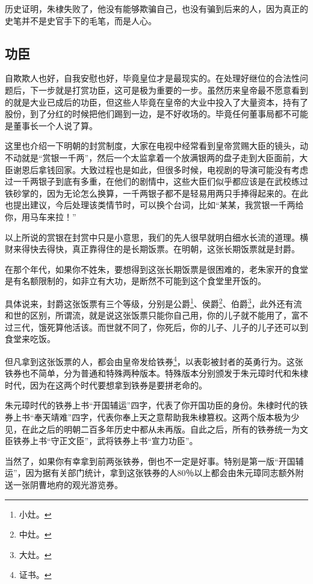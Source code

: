 \begin{multicols}{\theparacolNo}
历史证明，朱棣失败了，他没有能够欺骗自己，也没有骗到后来的人，因为真正的史笔并不是史官手下的毛笔，而是人心。

\subsection{功臣}
自欺欺人也好，自我安慰也好，毕竟皇位才是最现实的。在处理好继位的合法性问题后，下一步就是打赏功臣，这可是极为重要的一步。虽然历来皇帝最不愿意看到的就是大业已成后的功臣，但这些人毕竟在皇帝的大业中投入了大量资本，持有了股份，到了分红的时候把他们踢到一边，是不好收场的。毕竟任何董事局都不可能是董事长一个人说了算。

这里也介绍一下明朝的封赏制度，大家在电视中经常看到皇帝赏赐大臣的镜头，动不动就是“赏银一千两”，然后一个太监拿着一个放满银两的盘子走到大臣面前，大臣谢恩后拿钱回家。大致过程也是如此，但很多时候，电视剧的导演可能没有考虑过一千两银子到底有多重，在他们的剧情中，这些大臣们似乎都应该是在武校练过铁砂掌的，因为无论怎么换算，一千两银子都不是轻易用两只手捧得起来的。在此也提出建议，今后处理该类情节时，可以换个台词，比如“某某，我赏银一千两给你，用马车来拉！”

以上所说的赏银在封赏中只是小意思，我们的先人很早就明白细水长流的道理。横财来得快去得快，真正靠得住的是长期饭票。在明朝，这张长期饭票就是封爵。

在那个年代，如果你不姓朱，要想得到这张长期饭票是很困难的，老朱家开的食堂是有名额限制的，如非立有大功，是断然不可能到这个食堂里开饭的。

具体说来，封爵这张饭票有三个等级，分别是公爵\footnote{小灶。}、侯爵\footnote{中灶。}、伯爵\footnote{大灶。}，此外还有流和世的区别，所谓流，就是说这张饭票只能你自己用，你的儿子就不能用了，富不过三代，饿死算他活该。而世就不同了，你死后，你的儿子、儿子的儿子还可以到食堂来吃饭。

但凡拿到这张饭票的人，都会由皇帝发给铁券\footnote{证书。}，以表彰被封者的英勇行为。这张铁券也不简单，分为普通和特殊两种版本。特殊版本分别颁发于朱元璋时代和朱棣时代，因为在这两个时代要想拿到铁券是要拼老命的。

朱元璋时代的铁券上书“开国辅运”四字，代表了你开国功臣的身份。朱棣时代的铁券上书“奉天靖难”四字，代表你奉上天之意帮助我朱棣篡权。这两个版本极为少见，在此之后的明朝二百多年历史中都从未再版。自此之后，所有的铁券统一为文臣铁券上书“守正文臣”，武将铁券上书“宣力功臣”。

当然了，如果你有幸拿到前两张铁券，倒也不一定是好事。特别是第一版“开国辅运”，因为据有关部门统计，拿到这张铁券的人80％以上都会由朱元璋同志额外附送一张阴曹地府的观光游览券。


\end{multicols}
